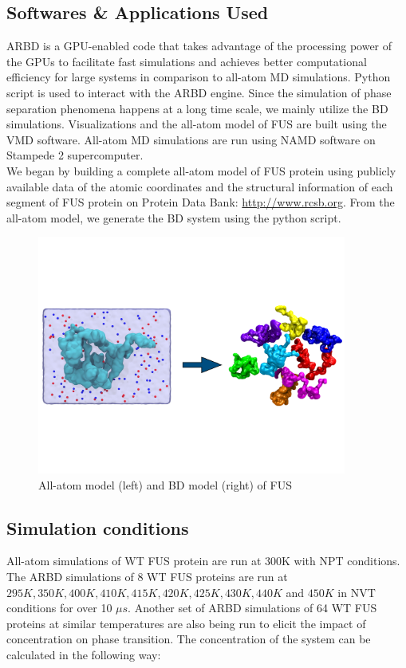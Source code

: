 \documentclass[12ptr]{article}
\begin{document}
\subsection{Softwares \& Applications Used}
ARBD is a GPU-enabled code that takes advantage of the processing power of the GPUs to facilitate fast simulations and achieves better computational efficiency for large systems in comparison to all-atom MD simulations. Python script is used to interact with the ARBD engine. Since the simulation of phase separation phenomena happens at a long time scale, we mainly utilize the BD simulations.
Visualizations and the all-atom model of FUS are built using the VMD software.
All-atom MD simulations are run using NAMD software on Stampede 2 supercomputer.\\

We began by building a complete all-atom model of FUS protein using publicly available data of the atomic coordinates and the structural information of each segment of FUS protein on Protein Data Bank: \href {http://www.rcsb.org}{http://www.rcsb.org}. From the all-atom model, we generate the BD system using the python script. 

\begin{figure}[!ht]
\begin{center}
\includegraphics[width=4.0in]{all_atom_bd.pdf}
 \caption {All-atom model (left) and BD model (right) of FUS }
 \end{center}
\end{figure}

\subsection{Simulation conditions}
All-atom simulations of WT FUS protein are run at 300K with NPT conditions. The ARBD simulations of 8 WT FUS proteins are run at $295K, 350K, 400K, 410K, 415K, 420K, 425K, 430K, 440K$ and $450K$ in NVT conditions for over 10 $\mu s$. Another set of ARBD simulations of 64 WT FUS proteins at similar temperatures are also being run to elicit the impact of concentration on phase transition. The concentration of the system can be calculated in the following way: 
\end{document}
